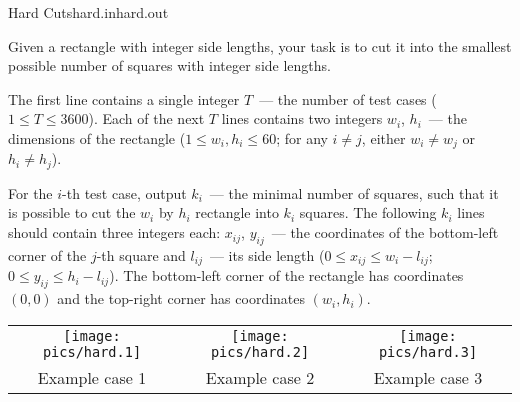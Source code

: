 
\begin{problem}{Hard Cuts}{hard.in}{hard.out}{\timeLimit}


Given a rectangle with integer side lengths, your task is to cut it into the smallest possible number of squares with integer side lengths.

\InputFile

The first line contains a single integer $T$~--- the number of test cases
($1 \le T \le 3600$).
Each of the next $T$ lines contains two integers $w_i$, $h_i$~---
the dimensions of the rectangle
($1 \le w_i, h_i \le 60$; for any $i \ne j$, either $w_i \ne w_j$ or $h_i \ne h_j$).

\OutputFile

For the $i$-th test case, output $k_i$~--- the minimal number of squares,
such that it is possible to cut the $w_i$ by $h_i$ rectangle into $k_i$ squares.
The following $k_i$ lines should contain three integers each:
$x_{ij}$, $y_{ij}$~--- the coordinates of the bottom-left corner of the $j$-th square
and $l_{ij}$~--- its side length
($0 \le x_{ij} \le w_i - l_{ij}$; $0 \le y_{ij} \le h_i - l_{ij}$).
The bottom-left corner of the rectangle has coordinates $(0, 0)$ and
the top-right corner has coordinates $(w_i, h_i)$.

\Example

\begin{example}
%
\end{example}

\begin{center}
\begin{tabular}{ccc}
    \texttt{[image: pics/hard.1]} &
    \texttt{[image: pics/hard.2]} &
    \texttt{[image: pics/hard.3]} \\
    Example case 1 &
    Example case 2 &
    Example case 3
\end{tabular}
\end{center}
\end{problem}

